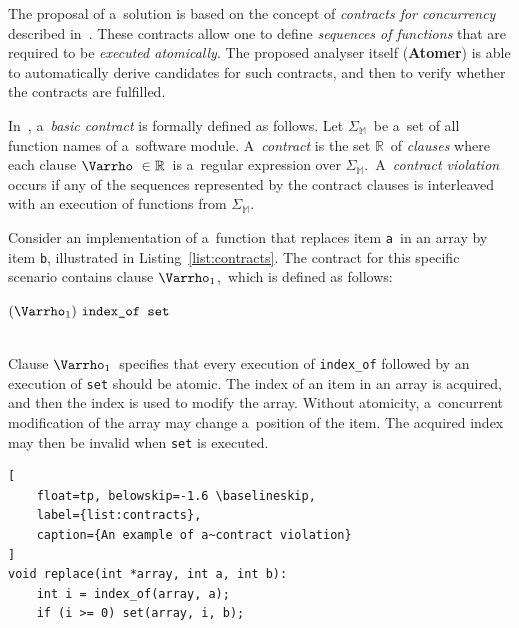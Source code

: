 \documentclass{ExcelAtFIT}
\begin{document}
The proposal of a~solution is based on the concept of
\emph{contracts for concurrency} described
in~\cite{atomicity-contracts}. These contracts
allow one to define \emph{sequences of functions} that are
required to be \emph{executed atomically}. The proposed
analyser itself (\textbf{Atomer}) is able to automatically
derive candidates for such contracts, and then to verify
whether the contracts are fulfilled.

In~\cite{atomicity-contracts},
a~\emph{basic contract} is formally defined as follows.
Let $ \Sigma_\mathbb{M} $~be a~set of all function names
of a~software module. A~\emph{contract} is
the set $ \mathbb{R} $~of \emph{clauses} where each
clause $ \Varrho\ \in \mathbb{R} $~is a~regular
expression over $ \Sigma_\mathbb{M} $.~A~\emph{contract
violation} occurs if any of the sequences represented by
the contract clauses is interleaved with an execution of
functions from $ \Sigma_\mathbb{M} $.

Consider an implementation of a~function that replaces
item \texttt{a}~in an array by item \texttt{b},
illustrated in Listing~\ref{list:contracts}. The contract
for this specific scenario contains
clause $ \Varrho_1 $,~which is defined as follows:
\\[0.4em]
\centerline{$
    (\Varrho_1)\ \text{\texttt{index\_of~set}}
$}
\\[0.4em]
Clause $ \Varrho_1 $~specifies that every execution
of \texttt{index\_of} followed by an execution of
\texttt{set} should be atomic. The index of an
item in an array is acquired, and then the index
is used to modify the array. Without atomicity,
a~concurrent modification of the array may change
a~position of the item. The acquired index may
then be invalid when \texttt{set} is executed.

\begin{lstlisting}[
    float=tp, belowskip=-1.6 \baselineskip,
    label={list:contracts},
    caption={An example of a~contract violation}
]
void replace(int *array, int a, int b):
    int i = index_of(array, a);
    if (i >= 0) set(array, i, b);
\end{lstlisting}
\end{document}
